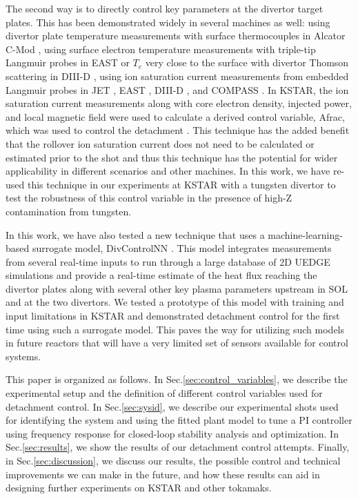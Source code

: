 The second way is to directly control key parameters at the divertor target plates.
This has been demonstrated widely in several machines as well:
using divertor plate temperature measurements with surface thermocouples in Alcator C-Mod \cite{Brunner_2017_NF},
using surface electron temperature measurements with triple-tip Langmuir probes in EAST \cite{Eldon_2021_NME} or $T_e$ very close to the surface with divertor Thomson scattering in DIII-D \cite{Eldon_2017_NF},
using ion saturation current measurements from embedded Langmuir probes in JET \cite{Guillemaut_2017_PPCF}, EAST \cite{Yuan_2020_FED}, DIII-D \cite{Eldon_2021_NME}, and COMPASS \cite{Khodunov_2021_PPCF}.
In KSTAR, the ion saturation current measurements along with core electron density, injected power, and local magnetic field were used to calculate a derived control variable, \ac{Afrac}, which was used to control the detachment \cite{Eldon_2022_PPCF}.
This technique has the added benefit that the rollover ion saturation current does not need to be calculated or estimated prior to the shot and thus this technique has the potential for wider applicability in different scenarios and other machines.
In this work, we have re-used this technique in our experiments at KSTAR with a tungsten divertor to test the robustness of this control variable in the presence of high-Z contamination from tungsten.

In this work, we have also tested a new technique that uses a machine-learning-based surrogate model, DivControlNN \cite{zhu_2025_pop}.
This model integrates measurements from several real-time inputs to run through a large database of 2D UEDGE \cite{Rognlien_1999_PP} simulations and provide a real-time estimate of the heat flux reaching the divertor plates along with several other key plasma parameters upstream in \ac{SOL} and at the two divertors.
We tested a prototype of this model with training and input limitations in KSTAR and demonstrated detachment control for the first time using such a surrogate model.
This paves the way for utilizing such models in future reactors that will have a very limited set of sensors available for control systems.

This paper is organized as follows.
In Sec.\ref{sec:control_variables}, we describe the experimental setup and the definition of different control variables used for detachment control.
In Sec.\ref{sec:sysid}, we describe our experimental shots used for identifying the system and using the fitted plant model to tune a PI controller using frequency response for closed-loop stability analysis and optimization.
In Sec.\ref{sec:results}, we show the results of our detachment control attempts.
Finally, in Sec.\ref{sec:discussion}, we discuss our results, the possible control and technical improvements we can make in the future, and how these results can aid in designing further experiments on KSTAR and other tokamaks.